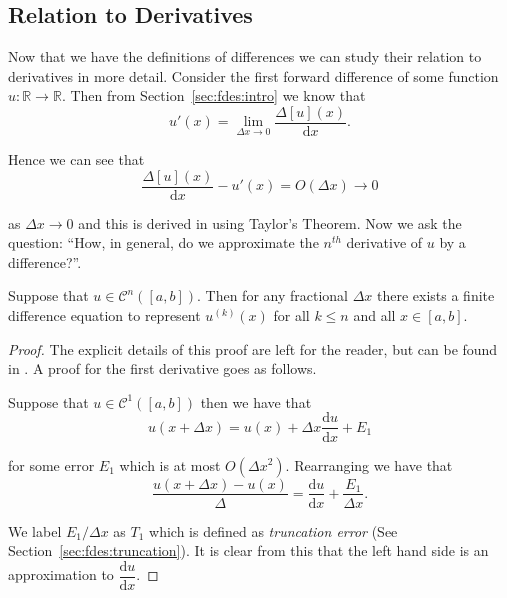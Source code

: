 \documentclass[../main.tex]{subfiles}
\begin{document}
  \subsection{Relation to Derivatives}\label{sec:fdes:relation}
  Now that we have the definitions of differences we can study their relation to derivatives in more detail. Consider the first forward difference of some function $u: \mathbb{R} \to \mathbb{R}$. Then from Section~\ref{sec:fdes:intro} we know that \\

  \begin{equation}
    u'(x)
    = \lim_{\Delta x \to 0} \frac{\Delta[u](x)}{\mathrm{d}x}.
  \end{equation}

  Hence we can see that \\

  \begin{equation}
    \frac{\Delta[u](x)}{\mathrm{d}x} - u'(x) = O(\Delta x) \to 0
  \end{equation}

  as $\Delta x \to 0$ and this is derived in \cite{hildebrand1987} using Taylor's Theorem. Now we ask the question: ``How, in general, do we approximate the $n^{th}$ derivative of $u$ by a difference?''.

  \begin{theorem}
    Suppose that $u \in \mathcal{C}^n([a, b])$. Then for any fractional $\Delta x$ there exists a finite difference equation to represent $u^{(k)}(x)$ for all $k \leq n$ and all $x \in [a, b]$.

    \begin{proof}
      The explicit details of this proof are left for the reader, but can be found in \cite{fornberg1988}. A proof for the first derivative goes as follows.

      Suppose that $u \in \mathcal{C}^1([a, b])$ then we have that\\

      \begin{equation}
        u(x + \Delta x) = u(x) + \Delta x \frac{\mathrm{d}u}{\mathrm{d}x} + E_1
      \end{equation}

      for some error $E_1$ which is at most $O(\Delta x^2)$. Rearranging we have that \\

      \begin{equation}
        \frac{u(x + \Delta x) - u(x)}{\Delta} = \frac{\mathrm{d}u}{\mathrm{d}x} + \frac{E_1}{\Delta x}.
      \end{equation}

      We label $E_1 / \Delta x$ as $T_1$ which is defined as \emph{truncation error} (See Section~\ref{sec:fdes:truncation}). It is clear from this that the left hand side is an approximation to $\dfrac{\mathrm{d}u}{\mathrm{d}x}$.
    \end{proof}
  \end{theorem}
\end{document}
